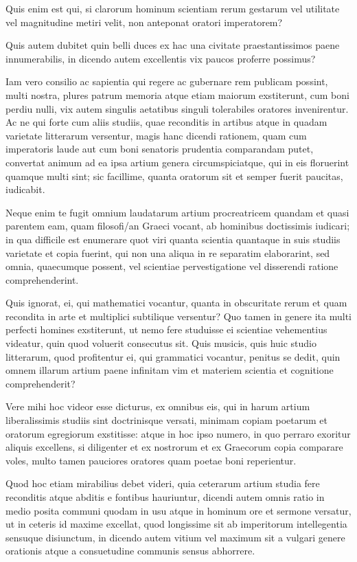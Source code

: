  Quis enim est qui, si clarorum hominum scientiam rerum gestarum vel utilitate vel magnitudine metiri velit, non anteponat oratori imperatorem?

 Quis autem dubitet quin belli duces ex hac una civitate praestantissimos paene innumerabilis, in dicendo autem excellentis vix paucos proferre possimus?

 Iam vero consilio ac sapientia qui regere ac gubernare rem publicam possint, multi nostra, plures patrum memoria atque etiam maiorum exstiterunt, cum boni perdiu nulli, vix autem singulis aetatibus singuli tolerabiles oratores invenirentur. Ac ne qui forte cum aliis studiis, quae reconditis in artibus atque in quadam varietate litterarum versentur, magis hanc dicendi rationem, quam cum imperatoris laude aut cum boni senatoris prudentia comparandam putet, convertat animum ad ea ipsa artium genera circumspiciatque, qui in eis floruerint quamque multi sint; sic facillime, quanta oratorum sit et semper fuerit paucitas, iudicabit.

 Neque enim te fugit omnium laudatarum artium procreatricem quandam et quasi parentem eam, quam filosofi/an Graeci vocant, ab hominibus doctissimis iudicari; in qua difficile est enumerare quot viri quanta scientia quantaque in suis studiis varietate et copia fuerint, qui non una aliqua in re separatim elaborarint, sed omnia, quaecumque possent, vel scientiae pervestigatione vel disserendi ratione comprehenderint.

 Quis ignorat, ei, qui mathematici vocantur, quanta in obscuritate rerum et quam recondita in arte et multiplici subtilique versentur? Quo tamen in genere ita multi perfecti homines exstiterunt, ut nemo fere studuisse ei scientiae vehementius videatur, quin quod voluerit consecutus sit. Quis musicis, quis huic studio litterarum, quod profitentur ei, qui grammatici vocantur, penitus se dedit, quin omnem illarum artium paene infinitam vim et materiem scientia et cognitione comprehenderit?

 Vere mihi hoc videor esse dicturus, ex omnibus eis, qui in harum artium liberalissimis studiis sint doctrinisque versati, minimam copiam poetarum et oratorum egregiorum exstitisse: atque in hoc ipso numero, in quo perraro exoritur aliquis excellens, si diligenter et ex nostrorum et ex Graecorum copia comparare voles, multo tamen pauciores oratores quam poetae boni reperientur.

 Quod hoc etiam mirabilius debet videri, quia ceterarum artium studia fere reconditis atque abditis e fontibus hauriuntur, dicendi autem omnis ratio in medio posita communi quodam in usu atque in hominum ore et sermone versatur, ut in ceteris id maxime excellat, quod longissime sit ab imperitorum intellegentia sensuque disiunctum, in dicendo autem vitium vel maximum sit a vulgari genere orationis atque a consuetudine communis sensus abhorrere.

